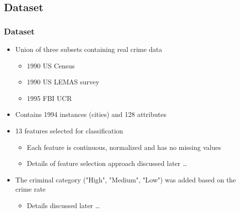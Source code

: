 \mode*

\begin{frame}
	\section{Dataset}
	\frametitle{Dataset}
	\onslide<+->
        \begin{itemize}
          \item<+-> Union of three subsets containing real crime data
            \begin{itemize}
              \item<+-> 1990 US Census
              \item<+-> 1990 US LEMAS survey
              \item<+-> 1995 FBI UCR
              \end{itemize}
          \item<+-> Contains 1994 instances (cities) and 128 attributes
          \item<+-> 13 features selected for classification
            \begin{itemize}
              \item<+-> Each feature is continuous, normalized and has no missing values
              \item<+-> Details of feature selection approach discussed later \ldots
            \end{itemize}
          \item<+-> The criminal category ("High", "Medium", "Low") was added based on the crime rate
            \begin{itemize}
              \item<+-> Details discussed later \ldots
            \end{itemize}
        \end{itemize}
\end{frame}

